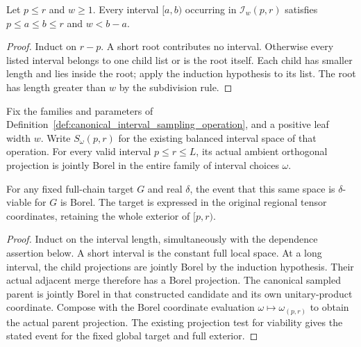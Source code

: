 \begin{lemma}
    \label{thm:balanced_interval_merge_bounds}
    \leanok
    Let $p\le r$ and $w\ge1$. Every interval $[a,b)$ occurring in
    $\mathcal I_w(p,r)$ satisfies
    $p\le a\le b\le r$ and $w<b-a$.
\end{lemma}
\begin{proof}\leanok
    Induct on $r-p$. A short root contributes no interval. Otherwise
    every listed interval belongs to one child list or is the root
    itself. Each child has smaller length and lies inside the root;
    apply the induction hypothesis to its list. The root has length
    greater than $w$ by the subdivision rule.
\end{proof}


\begin{lemma}
    \label{lem:borel_canonical_interval_sampling_tree}
    \leanok
    Fix the families and parameters of
    Definition~\ref{def:canonical_interval_sampling_operation}, and a
    positive leaf width $w$. Write $S_\omega(p,r)$ for the existing
    balanced interval space of that operation. For every valid interval
    $p\le r\le L$, its actual ambient orthogonal projection is jointly
    Borel in the entire family of interval choices $\omega$.

    For any fixed full-chain target $G$ and real $\delta$, the event that
    this same space is $\delta$-viable for $G$ is Borel. The target is
    expressed in the original regional tensor coordinates, retaining the
    whole exterior of $[p,r)$.
\end{lemma}
\begin{proof}\leanok
    Induct on the interval length, simultaneously with the dependence
    assertion below. A short interval is the constant full local space.
    At a long interval, the child projections are jointly Borel by the
    induction hypothesis. Their actual adjacent merge therefore has a
    Borel projection. The canonical sampled parent is jointly Borel in
    that constructed candidate and its own unitary-product coordinate.
    Compose with the Borel coordinate evaluation
    $\omega\mapsto\omega_{(p,r)}$ to obtain the actual parent projection.
    The existing projection test for viability gives the stated event
    for the fixed global target and full exterior.
\end{proof}

